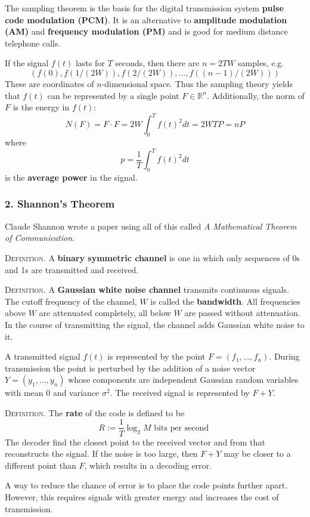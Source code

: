 \documentclass{article}
\renewcommand{\tt}[1]{\text{ #1 }}
\newcommand{\R}{\mathbb{R}}
\newcommand{\ass}[1]{\left( #1 \right)}
\newcommand{\header}[1]{\vspace{1em}\noindent\textsc{#1.} }
\begin{document}
The sampling theorem is the basis for the digital transmission system \textbf{pulse code modulation (PCM)}.
It is an alternative to \textbf{amplitude modulation (AM)} and \textbf{frequency modulation (PM)} and is good for medium distance telephone calls.

If the signal $f(t)$ lasts for $T$ seconds, then there are $n = 2TW$ samples, e.g.
$$ \ass{ f(0), f(1/(2W)), f(2/(2W)), \dots, f((n-1)/(2W)) } $$
These are coordinates of $n$-dimensional space.
Thus the sampling theory yields that $f(t)$ can be represented by a single point $F \in \R^n$.
Additionally, the norm of $F$ is the energy in $f(t)$:
$$ N(F) = F \cdot F = 2W \int_0^T f(t)^2 dt = 2WTP = nP $$
where
$$ p = \frac 1 T \int_0^T f(t)^2 dt $$
is the \textbf{average power} in the signal.

\subsubsection{2. Shannon's Theorem}

Claude Shannon wrote a paper using all of this called \textit{A Mathematical Theorem of Communication}.

\header{Definition}
A \textbf{binary symmetric channel} is one in which only sequences of 0s and 1s are transmitted and received.

\header{Definition}
A \textbf{Gaussian white noise channel} transmits continuous signals.
The cutoff frequency of the channel, $W$ is called the \textbf{bandwidth}.
All frequencies above $W$ are attenuated completely, all below $W$ are passed without attenuation.
In the course of transmitting the signal, the channel adds Gaussian white noise to it.

A transmitted signal $f(t)$ is represented by the point $F = (f_1, \dots, f_n)$.
During transmission the point is perturbed by the addition of a noise vector $Y = (y_1, \dots, y_n)$
whose components are independent Gaussian random variables with mean 0 and variance $\sigma^2$.
The received signal is represented by $F + Y$.

\header{Definition}
The \textbf{rate} of the code is defined to be
$$ R := \frac{1}{T} \log_2 M \tt{bits per second} $$
The decoder find the closest point to the received vector and from that reconstructs the signal.
If the noise is too large, then $F + Y$ may be closer to a different point than $F$, which results in a decoding error.

A way to reduce the chance of error is to place the code points further apart.
However, this requires signals with greater energy and increases the cost of transmission.
\end{document}
